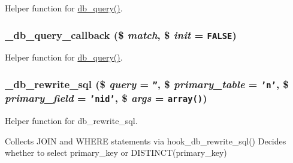 Helper function for \hyperlink{database_8mysql-common_8inc_9e096321b86945d128746ac7bedce8f3}{db\_\-query()}. \hypertarget{group__database_g337493a6287b3b48a5a2ba6d74e844bf}{
\subsubsection[{\_\-db\_\-query\_\-callback}]{\setlength{\rightskip}{0pt plus 5cm}\_\-db\_\-query\_\-callback (\$ {\em match}, \/  \$ {\em init} = {\tt FALSE})}}
\label{group__database_g337493a6287b3b48a5a2ba6d74e844bf}


Helper function for \hyperlink{database_8mysql-common_8inc_9e096321b86945d128746ac7bedce8f3}{db\_\-query()}. \hypertarget{group__database_g1c87af009b401cd8d695952f9eee20a9}{
\subsubsection[{\_\-db\_\-rewrite\_\-sql}]{\setlength{\rightskip}{0pt plus 5cm}\_\-db\_\-rewrite\_\-sql (\$ {\em query} = {\tt ''}, \/  \$ {\em primary\_\-table} = {\tt 'n'}, \/  \$ {\em primary\_\-field} = {\tt 'nid'}, \/  \$ {\em args} = {\tt array()})}}
\label{group__database_g1c87af009b401cd8d695952f9eee20a9}


Helper function for db\_\-rewrite\_\-sql.

Collects JOIN and WHERE statements via hook\_\-db\_\-rewrite\_\-sql() Decides whether to select primary\_\-key or DISTINCT(primary\_\-key)

